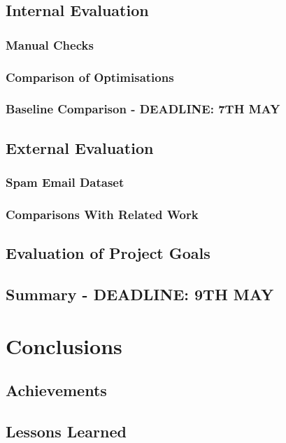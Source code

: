 \documentclass[12pt,a4paper,twoside,openright]{report}
\begin{document}
\section{Internal Evaluation}
\subsection{Manual Checks}
\subsection{Comparison of Optimisations} \label{eval-optimisations}
\subsection{Baseline Comparison - DEADLINE: 7TH MAY}

\section{External Evaluation}

\subsection{Spam Email Dataset} \label{eval-spam}
\subsection{Comparisons With Related Work}
\section{Evaluation of Project Goals}


\section{Summary - DEADLINE: 9TH MAY}


\chapter{Conclusions} \label{conc}

\section{Achievements}

\section{Lessons Learned}
\end{document}

